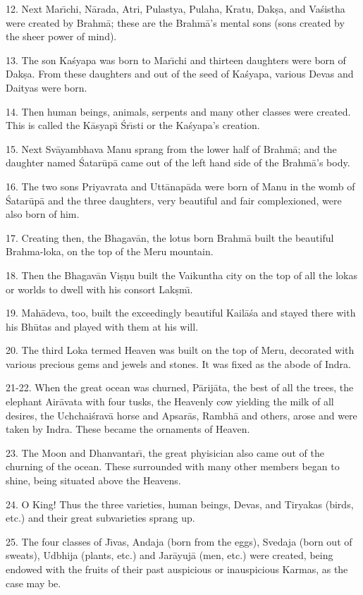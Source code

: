 12. Next Mar\={\i}chi, N\=arada, Atri, Pulastya, Pulaha, Kratu, Dak\d{s}a, and Va\'sistha were created by Brahm\=a; these are the Brahm\=a's mental sons (sons created by the sheer power of mind).

13. The son Ka\'syapa was born to Mar\={\i}chi and thirteen daughters were born of Dak\d{s}a. From these daughters and out of the seed of Ka\'syapa, various Devas and Daityas were born.

14. Then human beings, animals, serpents and many other classes were created. This is called the K\=asyap\={\i} \'Sr\={\i}sti or the Ka\'syapa's creation.

15. Next Sv\=ayambhava Manu sprang from the lower half of Brahm\=a; and the daughter named \'Satar\=up\=a came out of the left hand side of the Brahm\=a's body.

16. The two sons Priyavrata and Utt\=anap\=ada were born of Manu in the womb of \'Satar\=up\=a and the three daughters, very beautiful and fair complexioned, were also born of him.

17. Creating then, the Bhagav\=an, the lotus born Brahm\=a built the beautiful Brahma-loka, on the top of the Meru mountain.

18. Then the Bhagav\=an Vi\d{s}\d{n}u built the Vaikuntha city on the top of all the lokas or worlds to dwell with his consort Lak\d{s}m\={\i}.

19. Mah\=adeva, too, built the exceedingly beautiful Kail\=a\'sa and stayed there with his Bh\=utas and played with them at his will.

20. The third Loka termed Heaven was built on the top of Meru, decorated with various precious gems and jewels and stones. It was fixed as the abode of Indra.

21-22. When the great ocean was churned, P\=arij\=ata, the best of all the trees, the elephant Air\=avata with four tusks, the Heavenly cow yielding the milk of all desires, the Uchchai\'srav\=a horse and Apsar\=as, Rambh\=a and others, arose and were taken by Indra. These became the ornaments of Heaven.

23. The Moon and Dhanvantar\={\i}, the great phyisician also came out of the churning of the ocean. These surrounded with many other members began to shine, being situated above the Heavens.

24. O King! Thus the three varieties, human beings, Devas, and Tiryakas (birds, etc.) and their great subvarieties sprang up.

25. The four classes of J\={\i}vas, Andaja (born from the eggs), Svedaja (born out of sweats), Udbhija (plants, etc.) and Jar\=ayuj\=a (men, etc.) were created, being endowed with the fruits of their past auspicious or inauspicious Karmas, as the case may be.

